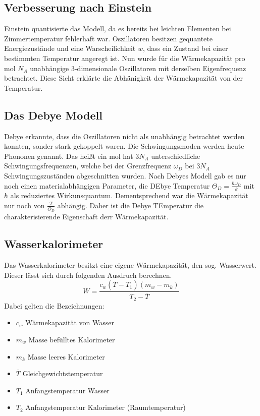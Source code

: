 \subsection{Verbesserung nach Einstein}
Einstein quantisierte das Modell, da es bereits bei leichten Elementen bei Zimmertemperatur fehlerhaft war.
Oszillatoren besitzen gequantete Energiezustände und eine Warscheilichkeit $w$, dass ein Zustand bei einer bestimmten Temperatur angeregt ist.
Nun wurde für die Wärmekapazität pro mol $N_A$ unabhängige 3-dimensionale Oszillatoren mit derselben Eigenfrequenz betrachtet.
Diese Sicht erklärte die Abhänigkeit der Wärmekapazität von der Temperatur.

\subsection{Das Debye Modell}

Debye erkannte, dass die Oszillatoren nicht als unabhängig betrachtet werden konnten, sonder stark gekoppelt waren.
Die Schwingungsmoden werden heute Phononen genannt. Das heißt ein mol hat $3N_A$ unterschiedliche Schwingungsfrequenzen, welche bei der Grenzfrequenz $\omega_D$ bei $3N_A$ Schwingungszuständen abgeschnitten wurden.
Nach Debyes Modell gab es nur noch einen materialabhängigen Parameter, die DEbye Temperatur $\Theta_D = \tfrac{\hbar \omega_D}{k}$ mit $\hbar$ als reduziertes Wirkunsquantum.
Dementsprechend war die Wärmekapazität nur noch von $\frac{T}{\Theta_D}$ abhängig. Daher ist die Debye TEmperatur die charakterisierende Eigenschaft derr Wärmekapazität.

\subsection{Wasserkalorimeter}
Das Wasserkalorimeter besitzt eine eigene Wärmekapazität, den sog. Wasserwert. Dieser lässt sich durch folgenden Ausdruch berechnen.
\begin{equation}
    W=\frac{c_{w} \left(\overline{T} - T_{1}\right) \left(  m_{w}- m_{k}\right)}{ T_{2}- \overline{T}}
    \label{eq:Wasserwert}
\end{equation}
Dabei gelten die Bezeichnungen:
\begin{itemize}
    \item $c_w$ Wärmekapazität von Wasser
    \item $m_w$ Masse befülltes Kalorimeter
    \item $m_k$ Masse leeres Kalorimeter
    \item $\overline{T}$ Gleichgewichtstemperatur
    \item $T_1$ Anfangstemperatur Wasser
    \item $T_2$ Anfangstemperatur Kalorimeter (Raumtemperatur)
\end{itemize}
